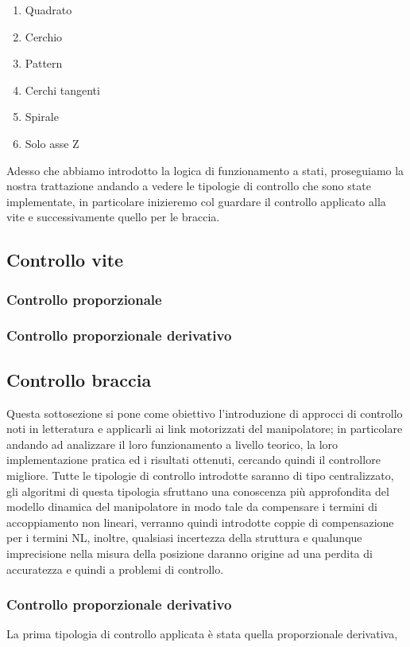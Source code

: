 \begin{enumerate}
	\item Quadrato
	\item Cerchio
	\item Pattern
	\item Cerchi tangenti
	\item Spirale
	\item Solo asse Z
\end{enumerate}
Adesso che abbiamo introdotto la logica di funzionamento a stati, proseguiamo la nostra trattazione andando a vedere le tipologie di controllo che sono state implementate, in particolare inizieremo col guardare il controllo applicato alla vite e successivamente quello per le braccia.
\subsection{Controllo vite}

\subsubsection{Controllo proporzionale}
\subsubsection{Controllo proporzionale derivativo}
\subsection{Controllo braccia}
Questa sottosezione si pone come obiettivo l'introduzione di approcci di controllo noti in letteratura e applicarli ai link motorizzati del manipolatore; in particolare andando ad analizzare il loro funzionamento a livello teorico, la loro implementazione pratica ed i risultati ottenuti, cercando quindi il controllore migliore. Tutte le tipologie di controllo introdotte saranno di tipo centralizzato, gli algoritmi di questa tipologia sfruttano una conoscenza più approfondita del modello dinamica del manipolatore in modo tale da compensare i termini di accoppiamento non lineari, verranno quindi introdotte coppie di compensazione per i termini NL, inoltre, qualsiasi incertezza della struttura e qualunque imprecisione nella misura della posizione daranno origine ad una perdita di accuratezza e quindi a problemi di controllo.
\subsubsection{Controllo proporzionale derivativo}
La prima tipologia di controllo applicata è stata quella proporzionale derivativa, 
